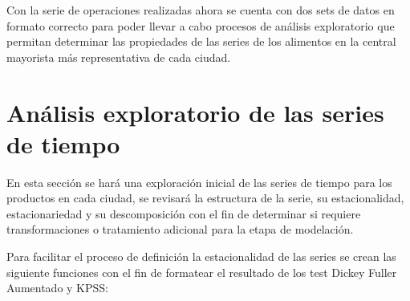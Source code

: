 \documentclass[
]{book}
\begin{document}
Con la serie de operaciones realizadas ahora se cuenta con dos sets de datos en formato correcto para poder llevar a cabo procesos de análisis exploratorio que permitan determinar las propiedades de las series de los alimentos en la central mayorista más representativa de cada ciudad.

\hypertarget{anuxe1lisis-exploratorio-de-las-series-de-tiempo}{%
\chapter{Análisis exploratorio de las series de tiempo}\label{anuxe1lisis-exploratorio-de-las-series-de-tiempo}}

En esta sección se hará una exploración inicial de las series de tiempo para los productos en cada ciudad, se revisará la estructura de la serie, su estacionalidad, estacionariedad y su descomposición con el fin de determinar si requiere transformaciones o tratamiento adicional para la etapa de modelación.

Para facilitar el proceso de definición la estacionalidad de las series se crean las siguiente funciones con el fin de formatear el resultado de los test Dickey Fuller Aumentado y KPSS:
\end{document}
